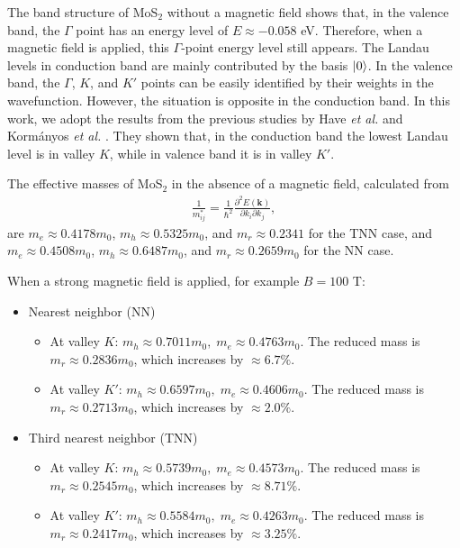 \documentclass{article}
\begin{document}
The band structure of MoS$_{2}$ without a magnetic field shows that, in the valence band, the $\Gamma$ point has an energy level of $E \approx -0.058$ eV. Therefore, when a magnetic field is applied, this $\Gamma$-point energy level still appears. The Landau levels in conduction band are mainly contributed by the basis $\ket{0}$. In the valence band, the $\Gamma$, $K$, and $K'$ points can be easily identified by their weights in the wavefunction. However, the situation is opposite in the conduction band. In this work, we adopt the results from the previous studies by Have \textit{et al.} and Korm{\'a}nyos \textit{et al.} \cite{have2019,kormanyos2015landau}. They shown that, in the conduction band the lowest Landau level is in valley $K$, while in valence band it is in valley $K'$.

The effective masses of MoS$_{2}$ in the absence of a magnetic field, calculated from
\begin{gather}
	\frac{1}{m_{ij}^{*}} = \frac{1}{\hbar^{2}} \frac{\partial^{2} E(\mathbf{k})}{\partial k_{i}\partial k_{j}},
\end{gather}
are $m_{e} \approx 0.4178 m_{0}$, $m_{h} \approx 0.5325 m_{0}$, and $m_{r} \approx 0.2341$ for the TNN case, and $m_{e} \approx 0.4508 m_{0}$, $m_{h} \approx 0.6487 m_{0}$, and $m_{r} \approx 0.2659 m_{0}$ for the NN case.

When a strong magnetic field is applied, for example $B = 100$ T:

\begin{itemize}
	\item[a)] Nearest neighbor (NN)
	      \begin{itemize}
		      \item At valley $K$: $m_{h} \approx 0.7011 m_{0},\; m_{e} \approx 0.4763 m_{0}$.
		            The reduced mass is $m_{r} \approx 0.2836 m_{0}$, which increases by $\approx 6.7\%$.

		      \item At valley $K'$: $m_{h} \approx 0.6597 m_{0},\; m_{e} \approx 0.4606 m_{0}$.
		            The reduced mass is $m_{r} \approx 0.2713 m_{0}$, which increases by $\approx 2.0\%$.
	      \end{itemize}
	\item[b)] Third nearest neighbor (TNN)
	      \begin{itemize}
		      \item At valley $K$: $m_{h} \approx 0.5739 m_{0},\; m_{e} \approx 0.4573 m_{0}$.
		            The reduced mass is $m_{r} \approx 0.2545 m_{0}$, which increases by $\approx 8.71\%$.

		      \item At valley $K'$: $m_{h} \approx 0.5584 m_{0},\; m_{e} \approx 0.4263 m_{0}$.
		            The reduced mass is $m_{r} \approx 0.2417 m_{0}$, which increases by $\approx 3.25\%$.
	      \end{itemize}
\end{itemize}
\end{document}
